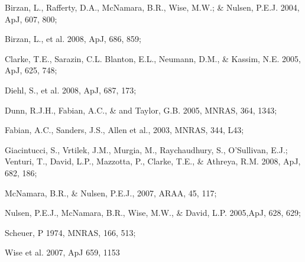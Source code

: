 \documentclass{article}
\begin{document}
Birzan, L., Rafferty, D.A., McNamara, B.R., Wise, M.W.; \& Nulsen, P.E.J.
2004, ApJ, 607, 800; 

Birzan, L., et al. 2008, ApJ, 686, 859;

Clarke, T.E., Sarazin, C.L. Blanton, E.L., Neumann, D.M., \& Kassim, N.E. 2005, ApJ, 625, 748;



Diehl, S., et al. 2008, ApJ, 687, 173; 

Dunn, R.J.H., Fabian, A.C., \& and Taylor, G.B. 2005, MNRAS, 364, 1343;

Fabian, A.C., Sanders, J.S., Allen et al., 2003, MNRAS, 344, L43;
 
Giacintucci, S., Vrtilek, J.M., Murgia, M., Raychaudhury, S., O'Sullivan, E.J.; Venturi, T., David, L.P., Mazzotta, P., Clarke, T.E.,
\& Athreya, R.M. 2008, ApJ, 682, 186;

McNamara, B.R., \& Nulsen, P.E.J., 2007, ARAA, 45, 117; 

Nulsen, P.E.J., McNamara, B.R., Wise, M.W., \& David, L.P. 2005,ApJ,
 628, 629; 

Scheuer, P 1974, MNRAS, 166, 513;

Wise et al. 2007,  ApJ 659, 1153
\end{document}
